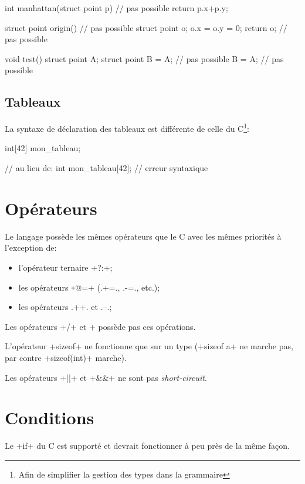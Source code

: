 \documentclass[a4paper]{article}
\begin{document}
      \begin{moc}
int manhattan(struct point p) { // pas possible
    return p.x+p.y;
}

struct point origin() { // pas possible
    struct point o;
    o.x = o.y = 0;
    return o; // pas possible
}

void test() {
    struct point A;
    struct point B = A; // pas possible
    B = A; // pas possible
}
      \end{moc}

    \subsection{Tableaux}
      La syntaxe de déclaration des tableaux est différente de celle du
      C\footnote{Afin de simplifier la gestion des types dans la grammaire}:
      \begin{moc}
int[42] mon_tableau;

// au lieu de:
int mon_tableau[42]; // erreur syntaxique
      \end{moc}

  \section{Opérateurs}
    Le langage possède les mêmes opérateurs que le C avec les mêmes priorités à
    l'exception de:
    \begin{itemize}
      \item l'opérateur ternaire \imoc+?:+;
      \item les opérateurs \texttt+@=+ (\imoc.+=., \imoc.-=., etc.);
      \item les opérateurs \imoc.++. et \imoc.--.;
    \end{itemize}

    Les opérateurs \imoc+/+ et \imoc+%
    possède pas ces opérations.

    L'opérateur \imoc+sizeof+ ne fonctionne que sur un type (\imoc+sizeof a+ ne
    marche pas, par contre \imoc+sizeof(int)+ marche).

    Les opérateurs \imoc+||+ et \imoc+&&+ ne sont pas \emph{short-circuit}.

  \section{Conditions}
    Le \imoc+if+ du C est supporté et devrait fonctionner à peu près de la même
    façon.
\end{document}
